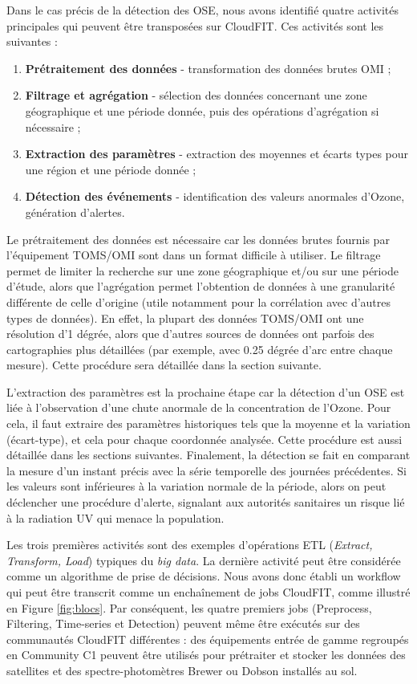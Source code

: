 Dans le cas précis de la détection des OSE, nous avons identifié quatre activités principales qui peuvent être transposées sur CloudFIT. Ces activités sont les suivantes : 
\begin{enumerate}
	\item \textbf{Prétraitement des données} - transformation des données brutes OMI ;
	\item \textbf{Filtrage et agrégation} - sélection des données concernant une zone géographique et une période donnée, puis des opérations d'agrégation si nécessaire ;
	\item \textbf{Extraction des paramètres} - extraction des moyennes et écarts types pour une région et une période donnée ;
	\item \textbf{Détection des événements} - identification des valeurs anormales d'Ozone, génération d'alertes.
\end{enumerate}

Le prétraitement des données est nécessaire car les données brutes fournis par l'équipement TOMS/OMI sont dans un format difficile à utiliser. Le filtrage permet de limiter la recherche sur une zone géographique et/ou sur une période d'étude, alors que l'agrégation permet l'obtention de données à une granularité différente de celle d'origine (utile notamment pour la corrélation avec d'autres types de données). En effet, la plupart des données TOMS/OMI ont une résolution d'1 dégrée, alors que d'autres sources de données ont parfois des cartographies plus détaillées (par exemple, avec 0.25 dégrée d'arc entre chaque mesure). Cette procédure sera détaillée dans la section suivante.

L'extraction des paramètres est la prochaine étape car la détection d'un OSE est liée à l'observation d'une chute anormale de la concentration de l'Ozone. Pour cela, il faut extraire des paramètres historiques tels que la moyenne et la variation (écart-type), et cela pour chaque coordonnée analysée. Cette procédure est aussi détaillée dans les sections suivantes. Finalement, la détection se fait en comparant la mesure d'un instant précis avec la série temporelle des journées précédentes. Si les valeurs sont inférieures à la variation normale de la période, alors on peut déclencher une procédure d'alerte, signalant aux autorités sanitaires un risque lié à la radiation UV qui menace la population.

Les trois premières activités sont des exemples d'opérations ETL (\textit{Extract, Transform, Load}) typiques du \textit{big data}. La dernière activité peut être considérée comme un algorithme de prise de décisions. Nous avons donc établi un workflow qui peut être transcrit comme un enchaînement de jobs CloudFIT, comme illustré en Figure \ref{fig:blocs}. Par conséquent, les quatre premiers jobs (Preprocess, Filtering, Time-series et Detection) peuvent même être exécutés sur des communautés CloudFIT différentes : des équipements entrée de gamme regroupés en Community C1 peuvent être utilisés pour prétraiter et stocker les données des satellites et des spectre-photomètres Brewer ou Dobson installés au sol. 

